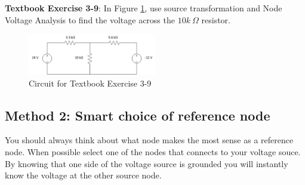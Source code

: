 \documentclass{handout}
\begin{document}
\textbf{Textbook Exercise 3-9}: In Figure \ref{fig: TextbookExercise3-9}, use source transformation and Node Voltage Analysis to find the voltage across the $10k\ \Omega$ resistor.
\begin{figure} [h t b]
\centering
\includegraphics[width=0.5\textwidth]{TextbookExercise3-9.jpg}
\caption{Circuit for Textbook Exercise 3-9}
\label{fig: TextbookExercise3-9}
\end{figure}


\newpage
\pagebreak
\clearpage

\subsection{Method 2: Smart choice of reference node}
You should always think about what node makes the most sense as a reference node.  When possible select one of the nodes that connects to your voltage souce.  By knowing that one side of the voltage source is grounded you will instantly know the voltage at the other source node.
\end{document}
